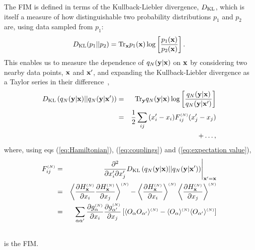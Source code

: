 \documentclass[reprint,amsmath,amssymb,aps]{revtex4-1}
\begin{document}
The FIM is defined in terms of the Kullback-Liebler divergence, $D_{\rm KL}$, which is itself a measure of how distinguishable two probability distributions $p_1$ and $p_2$ are, using data sampled from $p_1$:
\begin{equation}
D_{\rm KL}(p_1||p_2) = {\rm Tr}_{\bf x} p_1({\bf x}) \log \left[ \frac{p_1({\bf x})}{p_2({\bf x})} \right].
\label{eq:KL}
\end{equation}
This enables us to measure the dependence of $q_N({\bf y}|{\bf x})$ on ${\bf x}$ by considering two nearby data points, ${\bf x}$ and ${\bf x}'$, and expanding the Kullback-Liebler divergence as a Taylor series in their difference~\cite{MachtaChachraTranstrumSethna2013},
\begin{eqnarray}
D_{\rm KL}\left( q_N({\bf y}|{\bf x})||q_N({\bf y}|{\bf x}') \right) &=& {\rm Tr}_{\bf y} q_N({\bf y}|{\bf x}) \log \left[ \frac{q_N({\bf y}|{\bf x})}{q_N({\bf y}|{\bf x}')} \right] \nonumber\\
&=& \frac{1}{2} \sum_{ij}{(x'_i - x_i) F^{\scriptscriptstyle (N)}_{ij} (x'_j - x_j)} \nonumber\\
&& + \ldots,
\label{eq:KL expansion}
\end{eqnarray}
where, using eqs (\ref{eq:Hamiltonian}), (\ref{eq:couplings}) and (\ref{eq:expectation value}),
\begin{eqnarray}
F^{\scriptscriptstyle (N)}_{ij} &=& \left. \frac{\partial^2}{\partial x'_i \partial x'_j} D_{\rm KL}\left( q_N({\bf y}|{\bf x})||q_N({\bf y}|{\bf x}') \right) \right|_{{\bf x}' = {\bf x}} \nonumber\\
&=& \left\langle \frac{\partial H^{\scriptscriptstyle (N)}_{\bf x}}{\partial x_i} \frac{\partial H^{\scriptscriptstyle (N)}_{\bf x}}{\partial x_j} \right\rangle^{\scriptscriptstyle (N)}
 - \left\langle \frac{\partial H^{\scriptscriptstyle (N)}_{\bf x}}{\partial x_i} \right\rangle^{\scriptscriptstyle (N)} \left\langle \frac{\partial H^{\scriptscriptstyle (N)}_{\bf x}}{\partial x_j} \right\rangle^{\scriptscriptstyle (N)} \nonumber\\
&=& \sum_{\alpha\alpha'}{\frac{\partial g^{\scriptscriptstyle (N)}_\alpha}{\partial x_i} \frac{\partial g^{\scriptscriptstyle (N)}_{\alpha'}}{\partial x_j} \left[ \langle O_\alpha O_{\alpha'}\rangle^{\scriptscriptstyle (N)} - \langle O_\alpha \rangle^{\scriptscriptstyle (N)} \langle O_{\alpha'}\rangle^{\scriptscriptstyle (N)} \right]} \nonumber\\
&&
\label{eq:FIM}
\end{eqnarray}
is the FIM.
\end{document}
